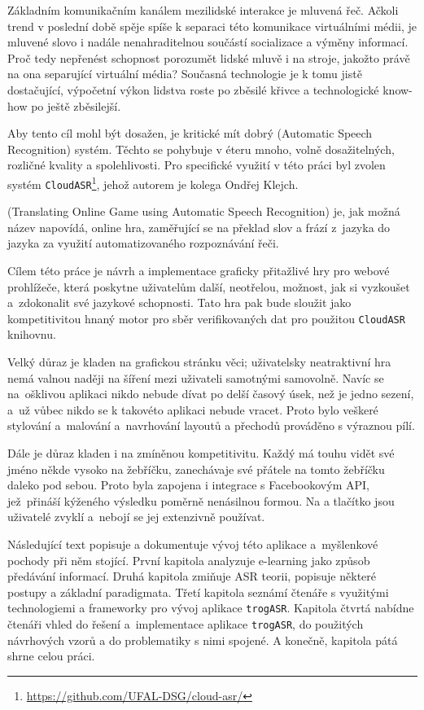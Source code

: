 
Základním komunikačním kanálem mezilidské interakce je mluvená řeč. Ačkoli trend v poslední době spěje spíše k separaci této komunikace virtuálními médii, je mluvené slovo i nadále nenahraditelnou součástí socializace a výměny informací. Proč tedy nepřenést schopnost porozumět lidské mluvě i na stroje, jakožto právě na ona separující virtuální média? Současná technologie je k tomu jistě dostačující, výpočetní výkon lidstva roste po zběsilé křivce a technologické know-how po ještě zběsilejší.

Aby tento cíl mohl být dosažen, je kritické mít dobrý  (Automatic Speech Recognition) systém. Těchto se pohybuje v éteru mnoho, volně dosažitelných, rozličné kvality a spolehlivosti. Pro specifické využití v této práci byl zvolen systém 
\verb|CloudASR|\footnote{\url{https://github.com/UFAL-DSG/cloud-asr/}}, jehož autorem je kolega Ondřej Klejch.

\texttt{} (Translating Online Game using Automatic Speech Recognition) je, jak možná název napovídá, online hra, zaměřující se na překlad slov a frází z~jazyka do jazyka za využití automatizovaného rozpoznávání řeči.

Cílem této práce je návrh a implementace graficky přitažlivé hry pro webové prohlížeče, která poskytne uživatelům další, neotřelou, možnost, jak si vyzkoušet a~zdokonalit své jazykové schopnosti. Tato hra pak bude sloužit jako kompetitivitou hnaný motor pro sběr verifikovaných dat pro použitou \verb|CloudASR| knihovnu.

Velký důraz je kladen na grafickou stránku věci; uživatelsky neatraktivní hra nemá valnou naději na šíření mezi uživateli samotnými samovolně. Navíc se na~ošklivou aplikaci nikdo nebude dívat po delší časový úsek, než je jedno sezení, a~už vůbec nikdo se k takovéto aplikaci nebude vracet. Proto bylo veškeré stylování a~malování a~navrhování layoutů a přechodů prováděno s výraznou pílí.

Dále je důraz kladen i na zmíněnou kompetitivitu. Každý má touhu vidět své jméno někde vysoko na žebříčku, zanechávaje své přátele na tomto žebříčku daleko pod sebou. Proto byla zapojena i integrace s Facebookovým API, jež~přináší kýženého výsledku poměrně nenásilnou formou. Na  a  tlačítko jsou uživatelé zvyklí a~nebojí se jej extenzivně používat.

Následující text popisuje a dokumentuje vývoj této aplikace a~myšlenkové pochody při něm stojící. První kapitola analyzuje e-learning jako způsob předávání informací. Druhá kapitola zmiňuje ASR teorii, popisuje některé postupy a základní paradigmata. Třetí kapitola seznámí čtenáře s využitými technologiemi a frameworky pro vývoj aplikace \verb|trogASR|. Kapitola čtvrtá nabídne čtenáři vhled do řešení a~implementace aplikace \verb|trogASR|, do použitých návrhových vzorů a do problematiky s nimi spojené. A konečně, kapitola pátá shrne celou práci.